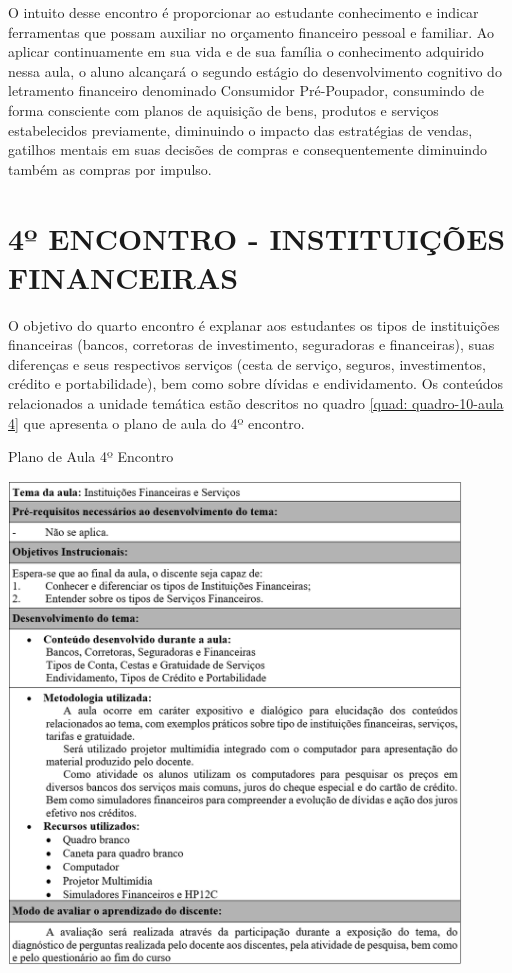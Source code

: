 O intuito desse encontro é proporcionar ao estudante conhecimento e indicar ferramentas que possam auxiliar no orçamento financeiro pessoal e familiar. Ao aplicar continuamente em sua vida e de sua família o conhecimento adquirido nessa aula, o aluno alcançará o segundo estágio do desenvolvimento cognitivo do letramento financeiro denominado Consumidor Pré-Poupador, consumindo de forma consciente com planos de aquisição de bens, produtos e serviços estabelecidos previamente, diminuindo o impacto das estratégias de vendas, gatilhos mentais em suas decisões de compras e consequentemente diminuindo também as compras por impulso.

\section{4º ENCONTRO - INSTITUIÇÕES FINANCEIRAS}
O objetivo do quarto encontro é explanar aos estudantes os tipos de instituições financeiras (bancos, corretoras de investimento, seguradoras e financeiras), suas diferenças e seus respectivos serviços (cesta de serviço, seguros, investimentos, crédito e portabilidade), bem como sobre dívidas e endividamento. Os conteúdos relacionados a unidade temática estão descritos no quadro \ref{quad: quadro-10-aula 4} que apresenta o plano de aula do 4º encontro.

\graphicspath{{quadros/}} 
\begin{quadro}[!ht]
\centering
\begin{minipage}{0.8\textwidth}
\caption{Plano de Aula 4º Encontro}
\centering
\includegraphics[width=0.9\textwidth]{quadro-10-aula 4}
\label{quad: quadro-10-aula 4}
\end{minipage}
\end{quadro}

